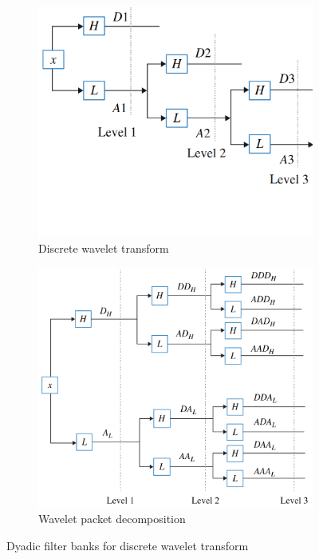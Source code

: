 \begin{figure}[ht]
    \centering
    \begin{subfigure}[b]{0.49\textwidth}
        \includegraphics[width=\textwidth]{assets/DWT.png}
        \caption{Discrete wavelet transform}
        \label{fig:dwt-filter-bank}
    \end{subfigure}
    \hfill
    \begin{subfigure}[b]{0.49\textwidth}
        \includegraphics[width=\textwidth]{assets/WPD.png}
        \caption{Wavelet packet decomposition}
        \label{fig:wpd-filter-bank}
    \end{subfigure}
    \caption{Dyadic filter banks for discrete wavelet transform~\cite{nandi_condition_2019}}
\end{figure}

